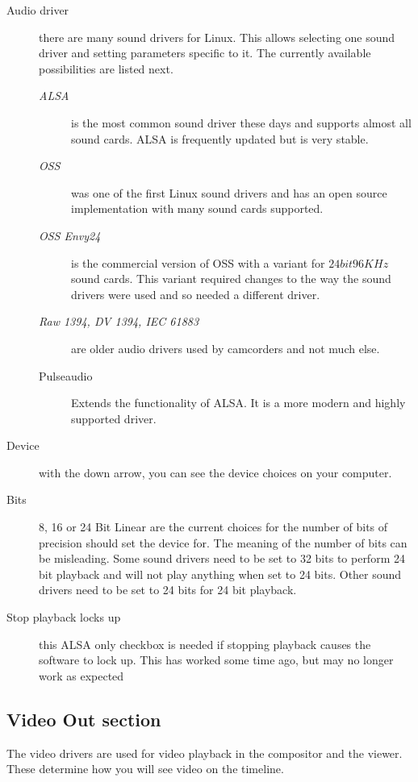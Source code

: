 \begin{description}
    \item[Audio driver]  there are many sound drivers for Linux. This allows selecting one sound driver and setting parameters specific to it. The currently available possibilities are listed next.
    \begin{description}
        \item[\textit{ALSA}] is the most common sound driver these days and supports almost all sound cards. ALSA
        is frequently updated but is very stable.
        \item[\textit{OSS}] was one of the first Linux sound drivers and has an open source implementation with many sound cards supported.
        \item[\textit{OSS Envy24}] is the commercial version of OSS with a variant for $24 bit 96 KHz$ sound cards. This variant required changes to the way the sound drivers were used and so needed a different driver.
        \item[\textit{Raw 1394, DV 1394, IEC 61883}] are older audio drivers used by camcorders and not much else.
        \item[Pulseaudio] Extends the functionality of ALSA. It is a more modern and highly supported driver.
    \end{description}
    \item[Device]  with the down arrow, you can see the device choices on your computer.
    \item[Bits] 8, 16 or 24 Bit Linear are the current choices for the number of bits of precision \CGG{} should set the device for. The meaning of the number of bits can be misleading. Some sound drivers need to be set to 32 bits to perform 24 bit playback and will not play anything when set to 24 bits. Other sound drivers need to be set to 24 bits for 24 bit playback.
    \item[Stop playback locks up] this ALSA only checkbox is needed if stopping playback causes the software to lock up.  This has worked some time ago, but may no longer work as expected
\end{description}

\subsection{Video Out section}%
\label{sub:video_out_section}

The video drivers are used for video playback in the compositor and the viewer.  These determine how you will see video on the timeline.

